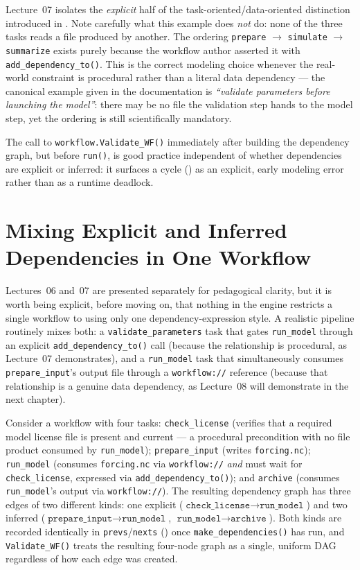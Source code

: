 Lecture~07 isolates the \emph{explicit} half of the task-oriented/data-oriented
distinction introduced in . Note carefully what this
example does \emph{not} do: none of the three tasks reads a file produced by
another. The ordering \texttt{prepare} $\to$ \texttt{simulate} $\to$
\texttt{summarize} exists purely because the workflow author asserted it with
\texttt{add\_dependency\_to()}. This is the correct modeling choice whenever
the real-world constraint is procedural rather than a literal data
dependency --- the canonical example given in the documentation is
\emph{``validate parameters before launching the model''}: there may be no
file the validation step hands to the model step, yet the ordering is still
scientifically mandatory.

The call to \texttt{workflow.Validate\_WF()} immediately after building the
dependency graph, but before \texttt{run()}, is good practice independent of
whether dependencies are explicit or inferred: it surfaces a cycle
() as an explicit, early modeling error rather than as a
runtime deadlock.

\section{Mixing Explicit and Inferred Dependencies in One Workflow}

Lectures~06 and~07 are presented separately for pedagogical clarity, but it is
worth being explicit, before moving on, that nothing in the engine restricts
a single workflow to using only one dependency-expression style. A realistic
pipeline routinely mixes both: a \texttt{validate\_parameters} task that
gates \texttt{run\_model} through an explicit \texttt{add\_dependency\_to()}
call (because the relationship is procedural, as Lecture~07 demonstrates), and
a \texttt{run\_model} task that simultaneously consumes
\texttt{prepare\_input}'s output file through a \texttt{workflow://}
reference (because that relationship is a genuine data dependency, as
Lecture~08 will demonstrate in the next chapter).

\begin{example}
Consider a workflow with four tasks: \texttt{check\_license} (verifies that a
required model license file is present and current --- a procedural
precondition with no file product consumed by \texttt{run\_model});
\texttt{prepare\_input} (writes \texttt{forcing.nc}); \texttt{run\_model}
(consumes \texttt{forcing.nc} via \texttt{workflow://} \emph{and} must wait
for \texttt{check\_license}, expressed via \texttt{add\_dependency\_to()});
and \texttt{archive} (consumes \texttt{run\_model}'s output via
\texttt{workflow://}). The resulting dependency graph has three edges of two
different kinds: one explicit ($\texttt{check\_license} \to
\texttt{run\_model}$) and two inferred ($\texttt{prepare\_input} \to
\texttt{run\_model}$, $\texttt{run\_model} \to \texttt{archive}$). Both
kinds are recorded identically in \texttt{prevs}/\texttt{nexts}
() once \texttt{make\_dependencies()} has run, and
\texttt{Validate\_WF()} treats the resulting four-node graph as a single,
uniform DAG regardless of how each edge was created.
\end{example}

